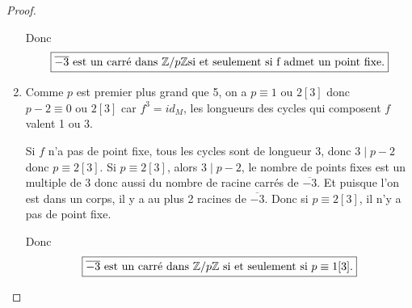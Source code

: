 \begin{proof}
\begin{enumerate}
		Donc 
		\begin{equation}
			\boxed{\overline{-3}\text{ est un carré dans }\mathbb{Z}/p\mathbb{Z}\text{si et seulement si f admet un point fixe.}}
		\end{equation}

		\item Comme $p$ est premier plus grand que 5, on a $p\equiv 1\text{ ou }2[3]$ donc $p-2\equiv 0\text{ ou }2[3]$ car $f^{3}=id_{M}$, les longueurs des cycles qui composent $f$ valent 1 ou 3. 
		
		Si $f$ n'a pas de point fixe, tous les cycles sont de longueur 3, donc $3\mid p-2$ donc $p\equiv 2[3]$. Si $p\equiv 2[3]$, alors $3\mid p-2$, le nombre de points fixes est un multiple de $3$ donc aussi du nombre de racine carrés de $\overline{-3}$. Et puisque l'on est dans un corps, il y a au plus 2 racines de $\overline{-3}$. Donc si $p\equiv2[3]$, il n'y a pas de point fixe.

		Donc 
		\begin{equation}
			\boxed{\overline{-3}\text{ est un carré dans }\mathbb{Z}/p\mathbb{Z}\text{ si et seulement si }p\equiv1[3].}
		\end{equation}
	\end{enumerate}
\end{proof}

